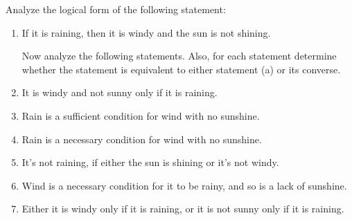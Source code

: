 Analyze the logical form of the following statement:
\begin{enumerate}[label=(\alph*)]
    \item If it is raining, then it is windy and the sun is not shining.

    Now analyze the following statements. Also, for each statement determine whether the statement is equivalent to either statement (a) or its converse.

    \item It is windy and not sunny only if it is raining.
    \item Rain is a sufficient condition for wind with no sunshine.
    \item Rain is a necessary condition for wind with no sunshine.
    \item It's not raining, if either the sun is shining or it's not windy.
    \item Wind is a necessary condition for it to be rainy, and so is a lack of sunshine.
    \item Either it is windy only if it is raining, or it is not sunny only if it is raining.
\end{enumerate}

